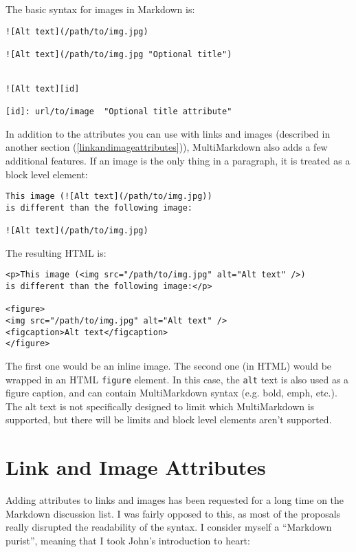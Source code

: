 The basic syntax for images in Markdown is:

\begin{verbatim}
![Alt text](/path/to/img.jpg)

![Alt text](/path/to/img.jpg "Optional title")


![Alt text][id]

[id]: url/to/image  "Optional title attribute"
\end{verbatim}

In addition to the attributes you can use with links and images (described in another section (\autoref{linkandimageattributes})), MultiMarkdown also adds a few additional features. If an image is the only thing in a paragraph, it is treated as a block level element:

\begin{verbatim}
This image (![Alt text](/path/to/img.jpg))
is different than the following image:

![Alt text](/path/to/img.jpg)
\end{verbatim}

The resulting HTML is:

\begin{verbatim}
<p>This image (<img src="/path/to/img.jpg" alt="Alt text" />)
is different than the following image:</p>

<figure>
<img src="/path/to/img.jpg" alt="Alt text" />
<figcaption>Alt text</figcaption>
</figure>
\end{verbatim}

The first one would be an inline image. The second one (in HTML) would be wrapped in an HTML \texttt{figure} element. In this case, the \texttt{alt} text is also used as a figure caption, and can contain MultiMarkdown syntax (e.g. bold, emph, etc.). The alt text is not specifically designed to limit which MultiMarkdown is supported, but there will be limits and block level elements aren't supported.

\section{Link and Image Attributes}
\label{linkandimageattributes}

Adding attributes to links and images has been requested for a long time on
the Markdown discussion list. I was fairly opposed to this, as most of the
proposals really disrupted the readability of the syntax. I consider myself a
``Markdown purist'', meaning that I took John's introduction to heart:

